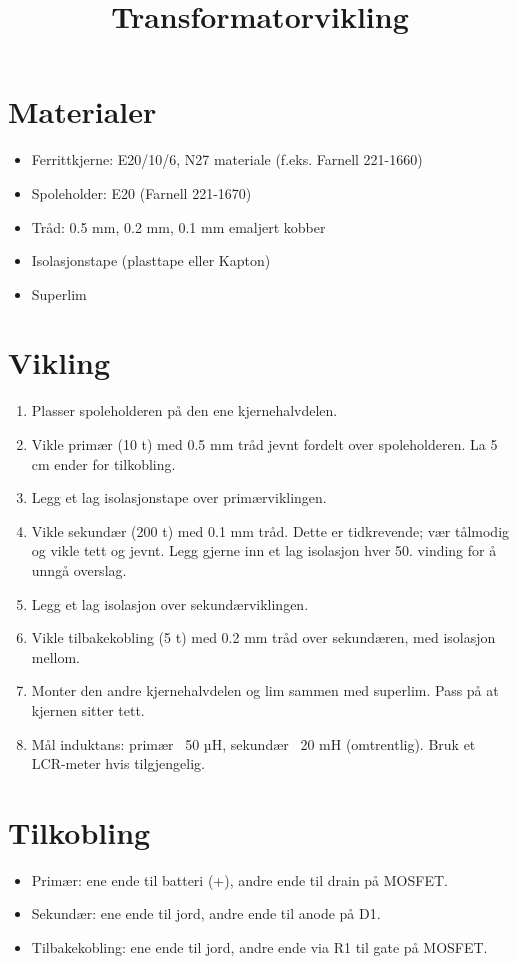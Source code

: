 \documentclass{article}
\title{Transformatorvikling}
\author{}
\date{}
\begin{document}
\maketitle

\section{Materialer}
\begin{itemize}
\item Ferrittkjerne: E20/10/6, N27 materiale (f.eks. Farnell 221-1660)
\item Spoleholder: E20 (Farnell 221-1670)
\item Tråd: 0.5 mm, 0.2 mm, 0.1 mm emaljert kobber
\item Isolasjonstape (plasttape eller Kapton)
\item Superlim
\end{itemize}

\section{Vikling}
\begin{enumerate}
\item Plasser spoleholderen på den ene kjernehalvdelen.
\item Vikle primær (10 t) med 0.5 mm tråd jevnt fordelt over spoleholderen. La 5 cm ender for tilkobling.
\item Legg et lag isolasjonstape over primærviklingen.
\item Vikle sekundær (200 t) med 0.1 mm tråd. Dette er tidkrevende; vær tålmodig og vikle tett og jevnt. Legg gjerne inn et lag isolasjon hver 50. vinding for å unngå overslag.
\item Legg et lag isolasjon over sekundærviklingen.
\item Vikle tilbakekobling (5 t) med 0.2 mm tråd over sekundæren, med isolasjon mellom.
\item Monter den andre kjernehalvdelen og lim sammen med superlim. Pass på at kjernen sitter tett.
\item Mål induktans: primær ~50 µH, sekundær ~20 mH (omtrentlig). Bruk et LCR-meter hvis tilgjengelig.
\end{enumerate}

\section{Tilkobling}
\begin{itemize}
\item Primær: ene ende til batteri (+), andre ende til drain på MOSFET.
\item Sekundær: ene ende til jord, andre ende til anode på D1.
\item Tilbakekobling: ene ende til jord, andre ende via R1 til gate på MOSFET.
\end{itemize}
\end{document}
